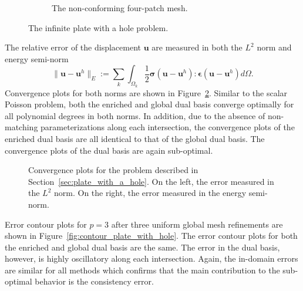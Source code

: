 \begin{figure}[ht]
\begin{subfigure}[t]{.3\textwidth}
		\caption{The non-conforming four-patch mesh.}
	\end{subfigure}
	\caption{The infinite plate with a hole problem.}\label{fig:plate_with_hole_setup}
\end{figure}

The relative error of the displacement $\mathbf{u}$ are measured in both the $L^2$ norm and energy semi-norm
\begin{equation}
	\|\mathbf{u}-\mathbf{u}^h\|_{E}:=\sum_k\int_{\Omega_k}\frac{1}{2}\mathbf{\sigma}(\mathbf{u}-\mathbf{u}^h) \colon \mathbf{\epsilon}(\mathbf{u}-\mathbf{u}^h) d \Omega.
\end{equation}
Convergence plots for both norms are shown in Figure~\ref{fig:convergence_plate_with_hole}. Similar to the scalar Poisson problem, both the enriched and global dual basis converge optimally for all polynomial degrees in both norms. In addition, due to the absence of non-matching parameterizations along each intersection, the convergence plots of the enriched dual basis are all identical to that of the global dual basis. The convergence plots of the \Bezier dual basis are again sub-optimal.\par

\begin{figure}[ht]
	\center
	\captionsetup[subfigure]{labelformat=empty}
	\begin{subfigure}{.45\linewidth}
		\center
		
	\end{subfigure}\hspace{2mm}
	\begin{subfigure}{.45\linewidth}
		\center
		
	\end{subfigure}
	\caption{Convergence plots for the problem described in Section~\ref{sec:plate_with_a_hole}. On the left, the error measured in the $L^2$ norm. On the right, the error measured in the energy semi-norm.}\label{fig:convergence_plate_with_hole}
\end{figure}

Error contour plots for $p=3$ after three uniform global mesh refinements are shown in Figure~\ref{fig:contour_plate_with_hole}. The error contour plots for both the enriched and global dual basis are the same. The error in the \Bezier dual basis, however, is highly oscillatory along each intersection. Again, the in-domain errors are similar for all methods which confirms that the main contribution to the sub-optimal behavior is the consistency error.

